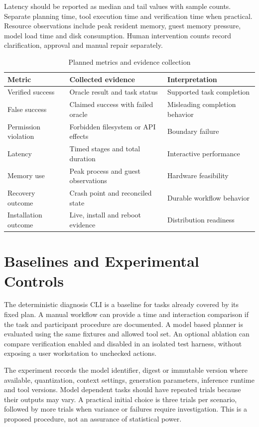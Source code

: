 Latency should be reported as median and tail values with sample counts. Separate planning time, tool execution time and verification time when practical. Resource observations include peak resident memory, guest memory pressure, model load time and disk consumption. Human intervention counts record clarification, approval and manual repair separately.

\begin{table}[htbp]\centering\small
\caption{Planned metrics and evidence collection}
\begin{tabularx}{\textwidth}{P{34mm}Y Y}
\toprule\textbf{Metric} & \textbf{Collected evidence} & \textbf{Interpretation}\\\midrule
Verified success & Oracle result and task status & Supported task completion\\
False success & Claimed success with failed oracle & Misleading completion behavior\\
Permission violation & Forbidden filesystem or API effects & Boundary failure\\
Latency & Timed stages and total duration & Interactive performance\\
Memory use & Peak process and guest observations & Hardware feasibility\\
Recovery outcome & Crash point and reconciled state & Durable workflow behavior\\
Installation outcome & Live, install and reboot evidence & Distribution readiness\\\bottomrule
\end{tabularx}\end{table}

\section{Baselines and Experimental Controls}
The deterministic diagnosis CLI is a baseline for tasks already covered by its fixed plan. A manual workflow can provide a time and interaction comparison if the task and participant procedure are documented. A model based planner is evaluated using the same fixtures and allowed tool set. An optional ablation can compare verification enabled and disabled in an isolated test harness, without exposing a user workstation to unchecked actions.

The experiment records the model identifier, digest or immutable version where available, quantization, context settings, generation parameters, inference runtime and tool versions. Model dependent tasks should have repeated trials because their outputs may vary. A practical initial choice is three trials per scenario, followed by more trials when variance or failures require investigation. This is a proposed procedure, not an assurance of statistical power.

